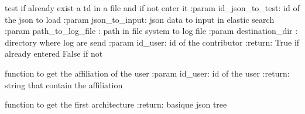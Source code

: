 \documentclass[letterpaper,10pt,english]{sphinxmanual}
\begin{document}

\begin{fulllineitems}
\label{\detokenize{QuChemPedIA.QuChemPedIA_lib:QuChemPedIA.QuChemPedIA_lib.import_file_lib.exist_td}}
test if already exist a td in a file and if not enter it
:param id\_json\_to\_test: id of the json to load
:param json\_to\_input: json data to input in elastic search
:param path\_to\_log\_file : path in file system to log file
:param destination\_dir : directory where log are send
:param id\_user: id of the contributor
:return: True if already entered False if not

\end{fulllineitems}


\begin{fulllineitems}
\label{\detokenize{QuChemPedIA.QuChemPedIA_lib:QuChemPedIA.QuChemPedIA_lib.import_file_lib.get_affiliation}}
function to get the affiliation of the user
:param id\_user: id of the user
:return: string that contain the affiliation

\end{fulllineitems}


\begin{fulllineitems}
\label{\detokenize{QuChemPedIA.QuChemPedIA_lib:QuChemPedIA.QuChemPedIA_lib.import_file_lib.get_base_json}}
function to get the first architecture
:return: basique json tree

\end{fulllineitems}

\end{document}

